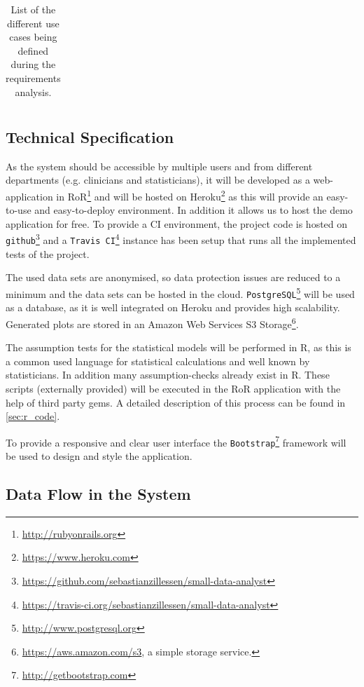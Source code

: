 \begin{landscape}
\begin{longtable}{ l l p{11cm} l l p{3cm} }
		\caption{List of the different use cases being defined during the requirements analysis.}	
		\label{tab:usecases}
	\end{longtable}
\end{landscape}






\subsection{Technical Specification}
\label{sub:technical}

As the system should be accessible by multiple users and from different departments (e.g. clinicians and statisticians), it will be developed as a web-application in \gls{RoR}\footnote{\url{http://rubyonrails.org}} and will be hosted on Heroku\footnote{\url{https://www.heroku.com}} as this will provide an easy-to-use and easy-to-deploy environment. In addition it allows us to host the demo application for free. To provide a \gls{CI} environment, the project code is hosted on \texttt{github}\footnote{\url{https://github.com/sebastianzillessen/small-data-analyst}} and a \texttt{Travis CI}\footnote{\url{https://travis-ci.org/sebastianzillessen/small-data-analyst}} instance has been setup that runs all the implemented tests of the project.

The used data sets are anonymised, so data protection issues are reduced to a minimum and the data sets can be hosted in the cloud. \texttt{PostgreSQL}\footnote{\url{http://www.postgresql.org}} will be used as a database, as it is well integrated on Heroku and provides high scalability. Generated plots are stored in an Amazon Web Services S3 Storage\footnote{\url{https://aws.amazon.com/s3}, a simple storage service.}.

The assumption tests for the statistical models will be performed in \gls{R}, as this is a common used language for statistical calculations and well known by statisticians. In addition many assumption-checks already exist in \gls{R}. These scripts (externally provided) will be executed in the \gls{RoR} application with the help of third party gems. A detailed description of this process can be found in \autoref{sec:r_code}.

To provide a responsive and clear user interface the \texttt{Bootstrap}\footnote{\url{http://getbootstrap.com}} framework will be used to design and style the application. 

\subsection{Data Flow in the System}


